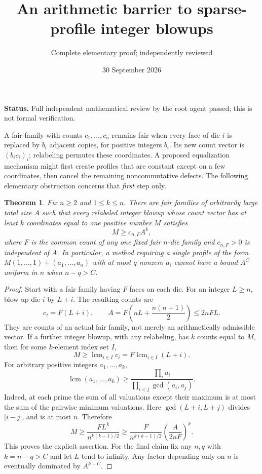 \documentclass[11pt]{article}
\title{An arithmetic barrier to sparse-profile integer blowups}
\author{Complete elementary proof; independently reviewed}
\date{30 September 2026}
\newtheorem{theorem}{Theorem}
\begin{document}
\maketitle
\noindent\textbf{Status.} Full independent mathematical review by the root agent passed; this is not formal verification.

A fair family with counts $c_1,\ldots,c_n$ remains fair when every face
of die $i$ is replaced by $b_i$ adjacent copies, for positive integers
$b_i$. Its new count vector is $(b_ic_i)_i$; relabeling permutes these
coordinates. A proposed equalization mechanism might first create
profiles that are constant except on a few coordinates, then cancel the
remaining noncommutative defects. The following elementary obstruction
concerns that \emph{first} step only.

\begin{theorem}\label{barrier}
Fix $n\ge2$ and $1\le k\le n$. There are fair families of arbitrarily
large total size $A$ such that every relabeled integer blowup whose
count vector has at least $k$ coordinates equal to one positive number
$M$ satisfies
\[
 M\ge c_{n,F} A^k,
\]
where $F$ is the common count of any one fixed fair $n$-die family and
$c_{n,F}>0$ is independent of $A$. In particular, a method requiring a
single profile of the form
$M(1,\ldots,1)+(a_1,\ldots,a_n)$ with at most $q$ nonzero $a_i$
cannot have a bound $A^C$ uniform in $n$ when $n-q>C$.
\end{theorem}
\begin{proof}
Start with a fair family having $F$ faces on each die. For an integer
$L\ge n$, blow up die $i$ by $L+i$. The resulting counts are
\[
 c_i=F(L+i),\qquad
 A=F\left(nL+\frac{n(n+1)}2\right)\le2nFL.
\]
They are counts of an actual fair family, not merely an arithmetically
admissible vector. If a further integer blowup, with any relabeling,
has $k$ counts equal to $M$, then for some $k$-element index set $I$,
\[
 M\ge\operatorname{lcm}_{i\in I}c_i
 =F\operatorname{lcm}_{i\in I}(L+i).
\]
For arbitrary positive integers $a_1,\ldots,a_k$,
\[
 \operatorname{lcm}(a_1,\ldots,a_k)
 \ge\frac{\prod_i a_i}{\prod_{i<j}\gcd(a_i,a_j)}.
\]
Indeed, at each prime the sum of all valuations except their maximum
is at most the sum of the pairwise minimum valuations. Here
$\gcd(L+i,L+j)$ divides $|i-j|$, and is at most $n$. Therefore
\[
 M\ge \frac{F L^k}{n^{k(k-1)/2}}
 \ge\frac{F}{n^{k(k-1)/2}}
       \left(\frac{A}{2nF}\right)^k.
\]
This proves the explicit assertion. For the final claim fix any
$n,q$ with $k=n-q>C$ and let $L$ tend to infinity. Any factor depending
only on $n$ is eventually dominated by $A^{k-C}$.
\end{proof}
\end{document}
